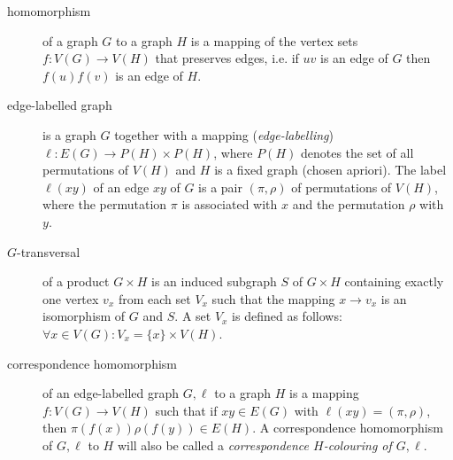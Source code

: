\documentclass{fit-teorsem}
\begin{document}
\maketsheader
\thispagestyle{empty}

\begin{description}
	\item[homomorphism] of a graph $G$ to a graph $H$ is a mapping of the vertex sets $f : V(G) \to V(H)$ 
		that preserves edges, i.e. if $uv$ is an edge of $G$ then $f(u)f(v)$ is an edge of $H$.
	\item[edge-labelled graph] is a graph $G$ together with a mapping (\textit{edge-labelling})
		$\ell : E(G) \to P(H) \times P(H)$, where $P(H)$ denotes the set of all permutations of $V(H)$ 
		and $H$ is a fixed graph (chosen apriori). The label $\ell(xy)$ of an edge $xy$ of $G$ is a pair
		$(\pi, \rho)$ of permutations of $V(H)$, where the permutation $\pi$ is associated with $x$ and
		the permutation $\rho$ with $y$.
	\item[$G$-transversal] of a product $G \times H$ is an induced subgraph $S$ of $G \times H$
		containing exactly one vertex $v_x$ from each set $V_x$ such that the mapping $x \to v_x$
		is an isomorphism of $G$ and $S$. A set $V_x$ is defined as follows:
		$\forall x \in V(G): V_x = \{x\} \times V(H)$.
	\item[correspondence homomorphism] of an edge-labelled graph $G, \ell$ to a graph $H$ is a mapping
		\hbox{$f : V(G) \to V(H)$} such that if $xy \in E(G)$ with $\ell(xy) = (\pi, \rho)$,
		then $\pi(f(x)) \rho(f(y)) \in E(H)$. A correspondence homomorphism of $G, \ell$ to $H$
		will also be called a \textit{correspondence $H$-colouring of $G, \ell$}.



\end{description}
\end{document}
